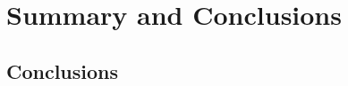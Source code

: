 \chapter{Summary and Conclusions}
\label{conclusion}

\ifpdf
    \graphicspath{{Chapter7/Figs/Raster/}{Chapter7/Figs/PDF/}{Chapter7/Figs/}}
\else
    \graphicspath{{Chapter7/Figs/Vector/}{Chapter7/Figs/}}
\fi

\section{Conclusions}
\label{conclusion:conclusion}